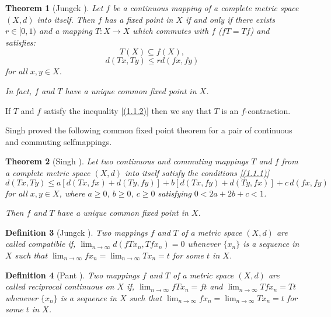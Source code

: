 \documentclass[a4paper,12pt,oneside]{article}
\newtheorem{theorem}{Theorem}[section]
\newtheorem{definition}[theorem]{Definition}
\numberwithin{equation}{section}
\begin{document}
\begin{theorem}[Jungck \cite{Jungck1976}] \label{thrm 1.1}
Let $f$ be a continuous mapping of a complete metric space $(X,d)$ into itself. Then $f$ has a fixed point in $X$ if and only if there exists $r\in [0,1)$ and a mapping $T:X\to X$ which commutes with $f$ ($fT = Tf$) and satisfies:
\begin{equation} \label{(1.1.1)}
    T(X)\subseteq f(X),
\end{equation}
\begin{equation} \label{(1.1.2)}
    d(Tx,Ty)\leq r d(fx,fy)
\end{equation}
for all $x, y\in X$.

In fact, $f$ and $T$ have a unique common fixed point in $X$.
\end{theorem}



If $T$ and $f$ satisfy the inequality \eqref{(1.1.2)} then we say that $T$ is an $f$-contraction.

Singh \cite{Singh1997a} proved the following common fixed point theorem for a pair of continuous and commuting selfmappings.

\begin{theorem}[Singh \cite{Singh1997a}] \label{thrm 1.2}
Let two continuous and commuting mappings $T$ and $f$ from a complete metric space $(X,d)$ into itself satisfy the  conditions \eqref{(1.1.1)}
\begin{equation} \label{(1.2.1)}
    d(Tx,Ty)\leq a[d(Tx,fx)+d(Ty,fy)] + b[d(Tx,fy)+d(Ty,fx)] + c\,d(fx,fy)
\end{equation}
for all $x,y\in X$, where $a\geq 0$, $b\geq 0$, $c\geq 0$ satisfying $0<2a+2b+c<1$.

Then $f$ and $T$ have a unique common fixed point in $X$.
\end{theorem}

\begin{definition}[Jungck \cite{Jungck1986}]
Two mappings $f$ and $T$ of a metric space $(X,d)$ are called \textit{compatible} if, $\lim_{n\to\infty}d(fTx_n,Tfx_n)=0$ whenever $\{x_n\}$ is a sequence in $X$ such that $\lim_{n\to\infty}fx_n=\lim_{n\to\infty}Tx_n=t$ for some $t$ in $X$.
\end{definition}

\begin{definition}[Pant \cite{Pant1998}]
Two mappings $f$ and $T$ of a metric space $(X,d)$ are called \textit{reciprocal continuous} on $X$ if, $\lim_{n\to\infty}fTx_n=ft$ and $\lim_{n\to\infty}Tfx_n=Tt$ whenever $\{x_n\}$ is a sequence in $X$ such that $\lim_{n\to\infty}fx_n=\lim_{n\to\infty}Tx_n=t$ for some $t$ in $X$.
\end{definition}
\end{document}
